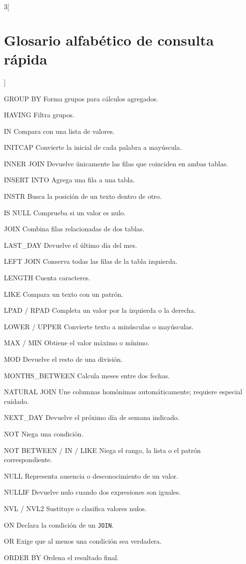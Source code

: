 \documentclass[10pt,letterpaper]{article}
\newenvironment{glossarylist}
  {\begin{description}[
    style=unboxed,
    leftmargin=0pt,
    labelindent=0pt,
    labelsep=0.45em,
    itemsep=0.18em,
    parsep=0pt,
    topsep=0.2em,
    font=\normalfont\ttfamily\bfseries]}
  {\end{description}}
\begin{document}
\begin{multicols}{3}[\section{Glosario alfabético de consulta rápida}]
\begin{glossarylist}
\item[GROUP BY] Forma grupos para cálculos agregados.
\item[HAVING] Filtra grupos.
\item[IN] Compara con una lista de valores.
\item[INITCAP] Convierte la inicial de cada palabra a mayúscula.
\item[INNER JOIN] Devuelve únicamente las filas que coinciden en ambas tablas.
\item[INSERT INTO] Agrega una fila a una tabla.
\item[INSTR] Busca la posición de un texto dentro de otro.
\item[IS NULL] Comprueba si un valor es nulo.
\item[JOIN] Combina filas relacionadas de dos tablas.
\item[LAST\_DAY] Devuelve el último día del mes.
\item[LEFT JOIN] Conserva todas las filas de la tabla izquierda.
\item[LENGTH] Cuenta caracteres.
\item[LIKE] Compara un texto con un patrón.
\item[LPAD / RPAD] Completa un valor por la izquierda o la derecha.
\item[LOWER / UPPER] Convierte texto a minúsculas o mayúsculas.
\item[MAX / MIN] Obtiene el valor máximo o mínimo.
\item[MOD] Devuelve el resto de una división.
\item[MONTHS\_BETWEEN] Calcula meses entre dos fechas.
\item[NATURAL JOIN] Une columnas homónimas automáticamente; requiere especial cuidado.
\item[NEXT\_DAY] Devuelve el próximo día de semana indicado.
\item[NOT] Niega una condición.
\item[NOT BETWEEN / IN / LIKE] Niega el rango, la lista o el patrón correspondiente.
\item[NULL] Representa ausencia o desconocimiento de un valor.
\item[NULLIF] Devuelve nulo cuando dos expresiones son iguales.
\item[NVL / NVL2] Sustituye o clasifica valores nulos.
\item[ON] Declara la condición de un \lstinline|JOIN|.
\item[OR] Exige que al menos una condición sea verdadera.
\item[ORDER BY] Ordena el resultado final.

\end{glossarylist}
\end{multicols}
\end{document}
